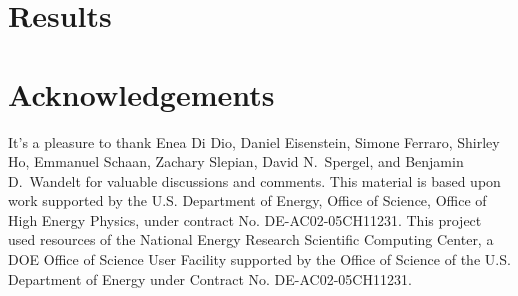 \documentclass[12pt, letterpaper, preprint]{aastex62}
\begin{document}





 

\section{Results} \label{sec:results} 
 
 

 

\section*{Acknowledgements}
It's a pleasure to thank 
    Enea Di Dio, 
    Daniel Eisenstein, 
    Simone Ferraro, 
    Shirley Ho, 
    Emmanuel Schaan, 
    Zachary Slepian, 
    David N.~Spergel, 
    and Benjamin D.~Wandelt
    for valuable discussions and comments. 
This material is based upon work supported by the U.S. Department 
of Energy, Office of Science, Office of High Energy Physics, under 
contract No. DE-AC02-05CH11231.
This project used resources of the National Energy Research 
Scientific Computing Center, a DOE Office of Science User 
Facility supported by the Office of Science of the U.S. 
Department of Energy under Contract No. DE-AC02-05CH11231.

\appendix
 



 
\end{document}

